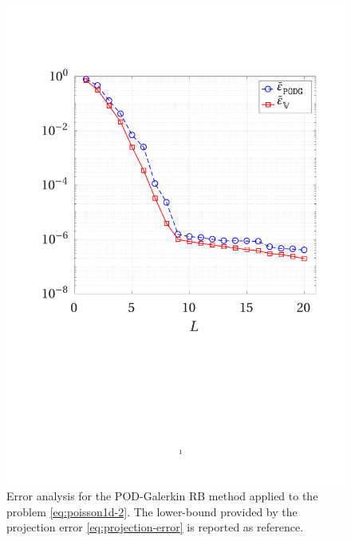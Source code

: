 \documentclass[12pt, a4paper, twoside, openright, notitlepage]{report}
\numberwithin{equation}{chapter}
\theoremstyle{theorem}
\theoremstyle{definition}
\theoremstyle{remark}
\theoremstyle{proposition}
\numberwithin{figure}{chapter}
\begin{document}
		\begin{figure}[b!]
			\center
			\includegraphics[scale = 0.43, trim = {1cm 10.5cm 1.5cm 3.5cm}, clip]{poisson1d_2_error_vs_rank}
			
			\caption{Error analysis for the POD-Galerkin RB method applied to the problem \eqref{eq:poisson1d-2}. The lower-bound provided by the projection error \eqref{eq:projection-error} is reported as reference.}
			\label{fig:poisson1d-2-fig1}
		\end{figure}
	
\end{document}
